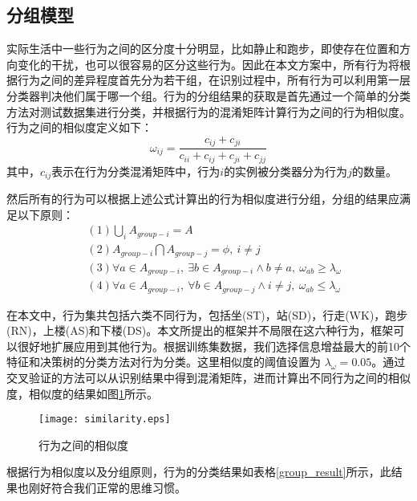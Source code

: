 \subsection{分组模型}
\par 实际生活中一些行为之间的区分度十分明显，比如静止和跑步，即使存在位置和方向变化的干扰，也可以很容易的区分这些行为。因此在本文方案中，所有行为将根据行为之间的差异程度首先分为若干组，在识别过程中，所有行为可以利用第一层分类器判决他们属于哪一个组。行为的分组结果的获取是首先通过一个简单的分类方法对测试数据集进行分类，并根据行为的混淆矩阵计算行为之间的行为相似度。行为之间的相似度定义如下：
\begin{equation}
    \omega_{ij}=\frac { c_{ij}+c_{ji} }{ c_{ii}+c_{ij}+c_{ji}+c_{jj} }
\end{equation}
其中，$c_{ij}$表示在行为分类混淆矩阵中，行为$i$的实例被分类器分为行为$j$的数量。
\par 然后所有的行为可以根据上述公式计算出的行为相似度进行分组，分组的结果应满足以下原则：
\begin{equation}
    \begin{aligned}
    &(1) \bigcup_i A_{group-i}=A \\ \
    &(2) A_{group-i}\bigcap A_{group-j}=\phi,\: i\neq j \\ \
    &(3) \forall a\in A_{group-i},\: \exists b\in A_{group-i}\wedge b\neq a, \: \omega_{ab} \geq \lambda_\omega\\ \
    &(4) \forall a\in A_{group-i},\: \forall b\in A_{group-j}\wedge i\neq j, \: \omega_{ab} \leq \lambda_\omega
    \end{aligned}
\end{equation}
\par 在本文中，行为集共包括六类不同行为，包括坐(ST)，站(SD)，行走(WK)，跑步(RN)，上楼(AS)和下楼(DS)。本文所提出的框架并不局限在这六种行为，框架可以很好地扩展应用到其他行为。根据训练集数据，我们选择信息增益最大的前10个特征和决策树的分类方法对行为分类。这里相似度的阈值设置为 $\lambda_\omega = 0.05$。通过交叉验证的方法可以从识别结果中得到混淆矩阵，进而计算出不同行为之间的相似度，相似度的结果如图\ref{similarity}所示。
\begin{figure}[!htb]
\centering
\texttt{[image: similarity.eps]}
\caption{行为之间的相似度}\label{similarity}
\end{figure}

\par 根据行为相似度以及分组原则，行为的分类结果如表格\ref{group_result}所示，此结果也刚好符合我们正常的思维习惯。

